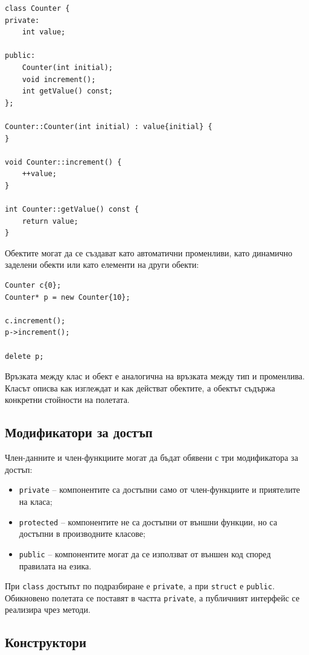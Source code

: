 \begin{verbatim}
class Counter {
private:
    int value;

public:
    Counter(int initial);
    void increment();
    int getValue() const;
};

Counter::Counter(int initial) : value{initial} {
}

void Counter::increment() {
    ++value;
}

int Counter::getValue() const {
    return value;
}
\end{verbatim}

Обектите могат да се създават като автоматични променливи, като динамично заделени обекти или като елементи на други обекти:

\begin{verbatim}
Counter c{0};
Counter* p = new Counter{10};

c.increment();
p->increment();

delete p;
\end{verbatim}

Връзката между клас и обект е аналогична на връзката между тип и променлива. Класът описва как изглеждат и как действат обектите, а обектът съдържа конкретни стойности на полетата.

\subsection{Модификатори за достъп}\label{s:16.2.1}

Член-данните и член-функциите могат да бъдат обявени с три модификатора за достъп:

\begin{itemize}
    \item \texttt{private} -- компонентите са достъпни само от член-функциите и приятелите на класа;
    \item \texttt{protected} -- компонентите не са достъпни от външни функции, но са достъпни в производните класове;
    \item \texttt{public} -- компонентите могат да се използват от външен код според правилата на езика.
\end{itemize}

При \texttt{class} достъпът по подразбиране е \texttt{private}, а при \texttt{struct} е \texttt{public}. Обикновено полетата се поставят в частта \texttt{private}, а публичният интерфейс се реализира чрез методи.

\subsection{Конструктори}\label{s:16.2.2}

